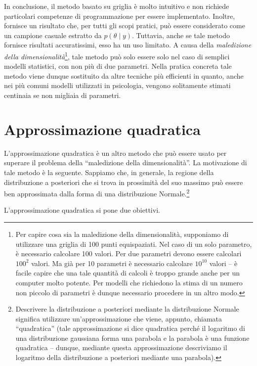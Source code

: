 \documentclass[
  11pt,
]{krantz}
\theoremstyle{definition}
\theoremstyle{definition}
\theoremstyle{definition}
\theoremstyle{definition}
\theoremstyle{remark}
\begin{document}
In conclusione, il metodo basato su griglia è molto intuitivo e non richiede particolari competenze di programmazione per essere implementato. Inoltre, fornisce un risultato che, per tutti gli scopi pratici, può essere considerato come un campione casuale estratto da \(p(\theta \mid y)\). Tuttavia, anche se tale metodo fornisce risultati accuratissimi, esso ha un uso limitato. A causa della \emph{maledizione della dimensionalità}\footnote{Per capire cosa sia la maledizione della dimensionalità, supponiamo di utilizzare una griglia di 100 punti equispaziati. Nel caso di un solo parametro, è necessario calcolare 100 valori. Per due parametri devono essere calcolari \(100^2\) valori. Ma già per 10 parametri è necessario calcolare \(10^{10}\) valori -- è facile capire che una tale quantità di calcoli è troppo grande anche per un computer molto potente. Per modelli che richiedono la stima di un numero non piccolo di parametri è dunque necessario procedere in un altro modo.}, tale metodo può solo essere solo nel caso di semplici modelli statistici, con non più di due parametri. Nella pratica concreta tale metodo viene dunque sostituito da altre tecniche più efficienti in quanto, anche nei più comuni modelli utilizzati in psicologia, vengono solitamente stimati centinaia se non migliaia di parametri.

\hypertarget{approssimazione-quadratica}{%
\section{Approssimazione quadratica}\label{approssimazione-quadratica}}

L'approssimazione quadratica è un altro metodo che può essere usato per superare il problema della ``maledizione della dimensionalità''. La motivazione di tale metodo è la seguente. Sappiamo che, in generale, la regione della distribuzione a posteriori che si trova in prossimità del suo massimo può essere ben approssimata dalla forma di una distribuzione Normale.\footnote{Descrivere la distribuzione a posteriori mediante la distribuzione Normale significa utilizzare un'approssimazione che viene, appunto, chiamata ``quadratica'' (tale approssimazione si dice quadratica perché il logaritmo di una distribuzione gaussiana forma una parabola e la parabola è una funzione quadratica -- dunque, mediante questa approssimazione descriviamo il logaritmo della distribuzione a posteriori mediante una parabola).}

L'approssimazione quadratica si pone due obiettivi.
\end{document}
